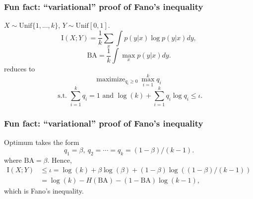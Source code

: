 \documentclass{beamer}
\begin{document}
\begin{frame}
\frametitle{Fun fact: ``variational'' proof of Fano's inequality}
$X \sim \text{Unif}\{1,...,k\}$, $Y \sim \text{Unif}[0,1]$.
\[
\text{I}(X; Y) = \frac{1}{k}\sum_x \int p(y|x) \log p(y|x) dy,
\]
\[
\text{BA} = \frac{1}{k} \int \max_x p(y|x) dy.
\]
reduces to
\[
\text{maximize}_{q_i \geq 0}\ \max_{i=1}^k q_i\]
\[ \text{ s.t. }\sum_{i=1}^k q_i =  1\text{ and }\log(k) + \sum_{i=1}^k q_i \log q_i\leq \iota.
\]
\end{frame}

\begin{frame}
\frametitle{Fun fact: ``variational'' proof of Fano's inequality}
Optimum takes the form
\[
q_1 = \beta,\ q_2 =\cdots=q_k = (1-\beta)/(k-1).
\]
where $\text{BA} = \beta$.
Hence,
\begin{align*}
\text{I}(X; Y) &\leq \iota = \log(k) + \beta \log(\beta) + (1-\beta)\log((1-\beta)/(k-1))
\\&= \log(k)-H(\text{BA}) - (1-\text{BA})\log(k-1),
\end{align*}
which is Fano's inequality.
\end{frame}
\end{document}
